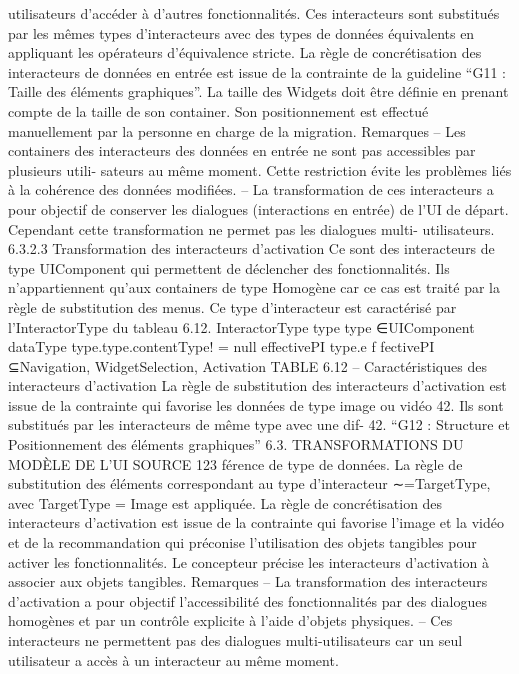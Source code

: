 \documentclass{article}
\begin{document}
utilisateurs d’accéder à d’autres fonctionnalités.
Ces interacteurs sont substitués par les mêmes types d’interacteurs avec des types de données
équivalents en appliquant les opérateurs d’équivalence stricte.
La règle de concrétisation des interacteurs de données en entrée
est issue de la contrainte de la
guideline “G11 : Taille des éléments graphiques”. La taille des Widgets doit être déﬁnie en prenant
compte de la taille de son container. Son positionnement est effectué manuellement par la personne
en charge de la migration.
Remarques
– Les containers des interacteurs des données en entrée ne sont pas accessibles par plusieurs utili-
sateurs au même moment. Cette restriction évite les problèmes liés à la cohérence des données
modiﬁées.
– La transformation de ces interacteurs a pour objectif de conserver les dialogues (interactions
en entrée) de l’UI de départ. Cependant cette transformation ne permet pas les dialogues multi-
utilisateurs.
6.3.2.3
Transformation des interacteurs d’activation
Ce sont des interacteurs de type UIComponent qui permettent de déclencher des fonctionnalités.
Ils n’appartiennent qu’aux containers de type Homogène car ce cas est traité par la règle de substitution
des menus. Ce type d’interacteur est caractérisé par l’InteractorType du tableau 6.12.
InteractorType
type
type ∈{UIComponent}
dataType
type.type.contentType! = null
effectivePI
type.e f fectivePI ⊆{Navigation, WidgetSelection, Activation}
TABLE 6.12 – Caractéristiques des interacteurs d’activation
La règle de substitution des interacteurs d’activation
est issue de la contrainte qui favorise les
données de type image ou vidéo 42. Ils sont substitués par les interacteurs de même type avec une dif-
42. “G12 : Structure et Positionnement des éléments graphiques”
6.3. TRANSFORMATIONS DU MODÈLE DE L’UI SOURCE
123
férence de type de données. La règle de substitution des éléments correspondant au type d’interacteur
∼=TargetType, avec TargetType = {Image} est appliquée.
La règle de concrétisation des interacteurs d’activation
est issue de la contrainte qui favorise
l’image et la vidéo et de la recommandation qui préconise l’utilisation des objets tangibles pour activer
les fonctionnalités. Le concepteur précise les interacteurs d’activation à associer aux objets tangibles.
Remarques
– La transformation des interacteurs d’activation a pour objectif l’accessibilité des fonctionnalités
par des dialogues homogènes et par un contrôle explicite à l’aide d’objets physiques.
– Ces interacteurs ne permettent pas des dialogues multi-utilisateurs car un seul utilisateur a accès
à un interacteur au même moment.
\end{document}
